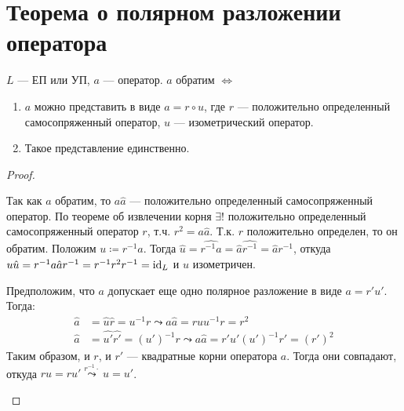 \section{Теорема о полярном разложении оператора}

\begin{thm*}
    $L$ --- ЕП или УП, $a$ --- оператор. $a$ обратим $\Leftrightarrow$
    \begin{enumerate}
        \item $a$ можно представить в виде $a = r \circ u$, где $r$ --- положительно определенный самосопряженный оператор, $u$ --- изометрический оператор.
        \item Такое представление единственно.
    \end{enumerate}
\end{thm*}

\begin{proof}
    \begin{proofpart}
        Так как $a$ обратим, то $a \hat{a}$ --- положительно определенный самосопряженный оператор. По теореме об извлечении корня $\exists!$ положительно определенный самосопряженный оператор $r$, т.ч. $r^2 = a \hat{a}$. Т.к. $r$ положительно определен, то он обратим. Положим $u \coloneqq r^{-1} a$. Тогда $\hat{u} = \widehat{r^{-1} a} = \hat{a} \widehat{r^{-1}} = \hat{a} r^{-1}$, откуда $u\hat{u} = r^{-1} a\hat{a} r^{-1} = r^{-1} r^2 r^{-1} = \operatorname{id}_L$ и $u$ изометричен.
    \end{proofpart}

    \begin{proofpart}
        Предположим, что $a$ допускает еще одно полярное разложение в виде $a = r'u'$. Тогда:
        \begin{align*}
            \hat{a} &= \hat{u}\hat{r} = u^{-1} r \leadsto a\hat{a} = ru u^{-1} r = r^2 \\
            \hat{a} &= \hat{u'}\hat{r'} = (u')^{-1} r \leadsto a\hat{a} = r'u' (u')^{-1} r' = (r')^2
        \end{align*}
        Таким образом, и $r$, и $r'$ --- квадратные корни оператора $a$. Тогда они совпадают, откуда $ru = ru' \stackrel{r^{-1} \cdot}{\leadsto} u = u'$.
    \end{proofpart}
\end{proof}